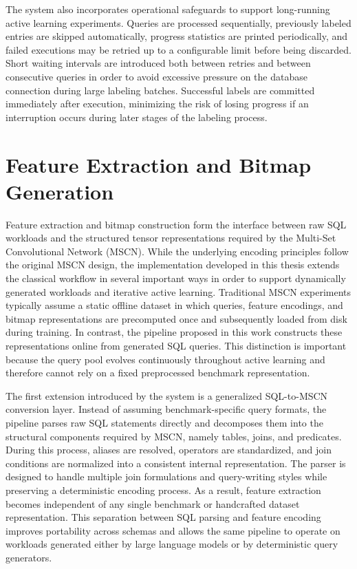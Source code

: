 The system also incorporates operational safeguards to support long-running active learning experiments. Queries are processed sequentially, previously labeled entries are skipped automatically, progress statistics are printed periodically, and failed executions may be retried up to a configurable limit before being discarded. Short waiting intervals are introduced both between retries and between consecutive queries in order to avoid excessive pressure on the database connection during large labeling batches. Successful labels are committed immediately after execution, minimizing the risk of losing progress if an interruption occurs during later stages of the labeling process.

\section{Feature Extraction and Bitmap Generation}

Feature extraction and bitmap construction form the interface between raw SQL workloads and the structured tensor representations required by the Multi-Set Convolutional Network (MSCN). While the underlying encoding principles follow the original MSCN design, the implementation developed in this thesis extends the classical workflow in several important ways in order to support dynamically generated workloads and iterative active learning. Traditional MSCN experiments typically assume a static offline dataset in which queries, feature encodings, and bitmap representations are precomputed once and subsequently loaded from disk during training. In contrast, the pipeline proposed in this work constructs these representations online from generated SQL queries. This distinction is important because the query pool evolves continuously throughout active learning and therefore cannot rely on a fixed preprocessed benchmark representation.

The first extension introduced by the system is a generalized SQL-to-MSCN conversion layer. Instead of assuming benchmark-specific query formats, the pipeline parses raw SQL statements directly and decomposes them into the structural components required by MSCN, namely tables, joins, and predicates. During this process, aliases are resolved, operators are standardized, and join conditions are normalized into a consistent internal representation. The parser is designed to handle multiple join formulations and query-writing styles while preserving a deterministic encoding process. As a result, feature extraction becomes independent of any single benchmark or handcrafted dataset representation. This separation between SQL parsing and feature encoding improves portability across schemas and allows the same pipeline to operate on workloads generated either by large language models or by deterministic query generators.

